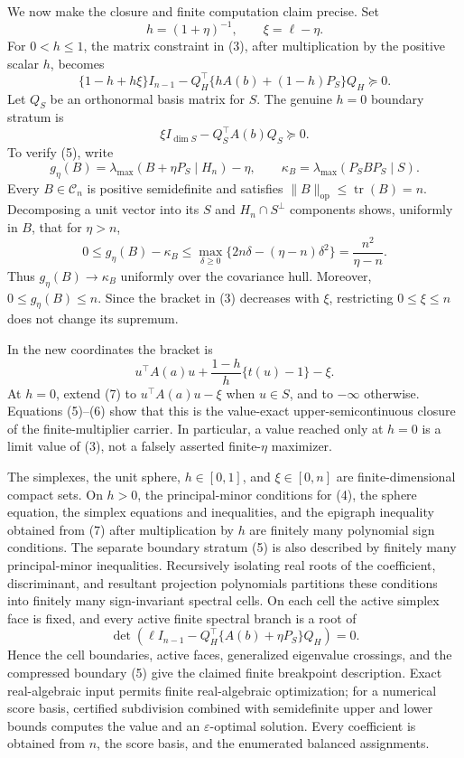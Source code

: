 We now make the closure and finite computation claim precise. Set
\[
h=(1+\eta)^{-1},
\qquad
\xi=\ell-\eta.
\]
For \(0<h\leq1\), the matrix constraint in (3), after multiplication by the positive scalar \(h\), becomes
\[
\{1-h+h\xi\}I_{n-1}
-Q_H^\top\{hA(b)+(1-h)P_S\}Q_H\succeq0.
\tag{4}
\]
Let \(Q_S\) be an orthonormal basis matrix for \(S\). The genuine \(h=0\) boundary stratum is
\[
\xi I_{\dim S}-Q_S^\top A(b)Q_S\succeq0.
\tag{5}
\]
To verify (5), write
\[
g_\eta(B)=\lambda_{\max}(B+\eta P_S\mid H_n)-\eta,
\qquad
\kappa_B=\lambda_{\max}(P_SBP_S\mid S).
\]
Every \(B\in\mathcal C_n\) is positive semidefinite and satisfies \(\|B\|_{\mathrm{op}}\leq\operatorname{tr}(B)=n\). Decomposing a unit vector into its \(S\) and \(H_n\cap S^\perp\) components shows, uniformly in \(B\), that for \(\eta>n\),
\[
0\leq g_\eta(B)-\kappa_B
\leq\max_{\delta\geq0}
\{2n\delta-(\eta-n)\delta^2\}
=\frac{n^2}{\eta-n}.
\tag{6}
\]
Thus \(g_\eta(B)\to\kappa_B\) uniformly over the covariance hull. Moreover, \(0\leq g_\eta(B)\leq n\). Since the bracket in (3) decreases with \(\xi\), restricting \(0\leq\xi\leq n\) does not change its supremum.

In the new coordinates the bracket is
\[
u^\top A(a)u+\frac{1-h}{h}\{t(u)-1\}-\xi.
\tag{7}
\]
At \(h=0\), extend (7) to \(u^\top A(a)u-\xi\) when \(u\in S\), and to \(-\infty\) otherwise. Equations (5)--(6) show that this is the value-exact upper-semicontinuous closure of the finite-multiplier carrier. In particular, a value reached only at \(h=0\) is a limit value of (3), not a falsely asserted finite-\(\eta\) maximizer.

The simplexes, the unit sphere, \(h\in[0,1]\), and \(\xi\in[0,n]\) are finite-dimensional compact sets. On \(h>0\), the principal-minor conditions for (4), the sphere equation, the simplex equations and inequalities, and the epigraph inequality obtained from (7) after multiplication by \(h\) are finitely many polynomial sign conditions. The separate boundary stratum (5) is also described by finitely many principal-minor inequalities. Recursively isolating real roots of the coefficient, discriminant, and resultant projection polynomials partitions these conditions into finitely many sign-invariant spectral cells. On each cell the active simplex face is fixed, and every active finite spectral branch is a root of
\[
\det\!\left(\ell I_{n-1}
-Q_H^\top\{A(b)+\eta P_S\}Q_H\right)=0.
\]
Hence the cell boundaries, active faces, generalized eigenvalue crossings, and the compressed boundary (5) give the claimed finite breakpoint description. Exact real-algebraic input permits finite real-algebraic optimization; for a numerical score basis, certified subdivision combined with semidefinite upper and lower bounds computes the value and an \(\varepsilon\)-optimal solution. Every coefficient is obtained from \(n\), the score basis, and the enumerated balanced assignments.

